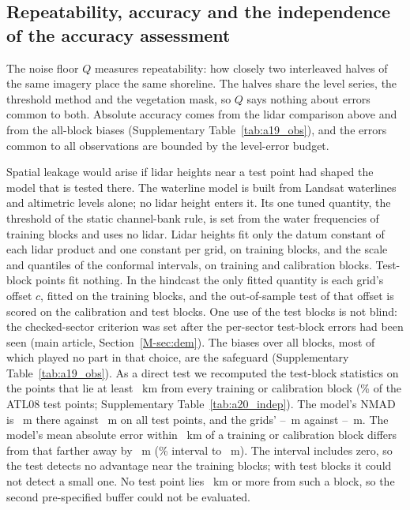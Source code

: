 \subsection*{Repeatability, accuracy and the independence of the accuracy assessment}
The noise floor $Q$ measures repeatability: how closely two interleaved halves of the same imagery place the same shoreline. The halves share the level series, the threshold method and the vegetation mask, so $Q$ says nothing about errors common to both. Absolute accuracy comes from the lidar comparison above and from the all-block biases (Supplementary Table~\ref{tab:a19_obs}), and the errors common to all observations are bounded by the level-error budget.

Spatial leakage would arise if lidar heights near a test point had shaped the model that is tested there. The waterline model is built from Landsat waterlines and altimetric levels alone; no lidar height enters it. Its one tuned quantity, the threshold of the static channel-bank rule, is set from the water frequencies of training blocks and uses no lidar. Lidar heights fit only the datum constant of each lidar product and one constant per grid, on training blocks, and the scale and quantiles of the conformal intervals, on training and calibration blocks. Test-block points fit nothing. In the hindcast the only fitted quantity is each grid's offset $c$, fitted on the training blocks, and the out-of-sample test of that offset is scored on the calibration and test blocks. One use of the test blocks is not blind: the checked-sector criterion was set after the per-sector test-block errors had been seen (main article, Section~\ref{M-sec:dem}). The biases over all blocks, most of which played no part in that choice, are the safeguard (Supplementary Table~\ref{tab:a19_obs}). As a direct test we recomputed the test-block statistics on the points that lie at least ~km from every training or calibration block (\% of the ATL08 test points; Supplementary Table~\ref{tab:a20_indep}). The model's NMAD is ~m there against ~m on all test points, and the grids' --~m against --~m. The model's mean absolute error within ~km of a training or calibration block differs from that farther away by ~m (\% interval  to ~m). The interval includes zero, so the test detects no advantage near the training blocks; with  test blocks it could not detect a small one. No test point lies ~km or more from such a block, so the second pre-specified buffer could not be evaluated.

